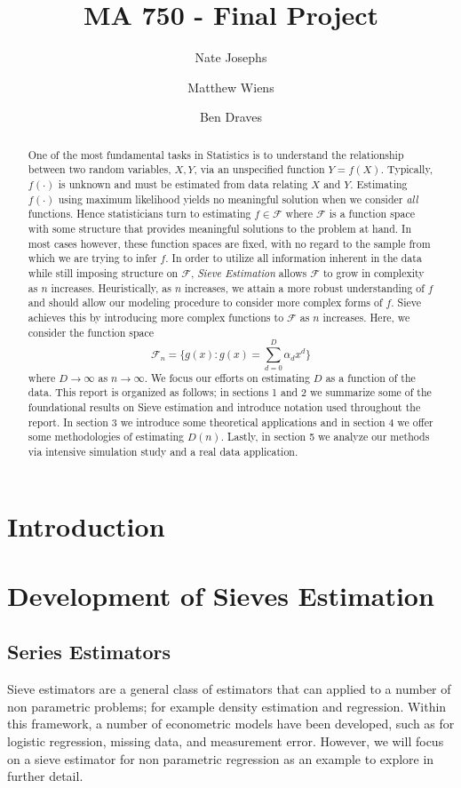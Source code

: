 \documentclass[12pt]{article}  %
\title{MA 750 - Final Project}
\author{
  Nate Josephs\\
  \and
  Matthew Wiens 
  \and 
  Ben Draves
}
\begin{document}
\maketitle 
\begin{abstract} One of the most fundamental tasks in Statistics is to understand the relationship between two random variables, $X,Y$, via an unspecified function $Y = f(X)$. Typically, $f(\cdot)$ is unknown and must be estimated from data relating $X$ and $Y$. Estimating $f(\cdot)$ using maximum likelihood yields no meaningful solution when we consider \textit{all} functions. Hence statisticians turn to estimating $f\in\mathcal{F}$ where $\mathcal{F}$ is a function space with some structure that provides meaningful solutions to the problem at hand. In most cases however, these function spaces are fixed, with no regard to the sample from which we are trying to infer $f$. In order to utilize all information inherent in the data while still imposing structure on $\mathcal{F}$, \textit{Sieve Estimation} allows $\mathcal{F}$ to grow in complexity as $n$ increases. Heuristically, as $n$ increases, we attain a more robust understanding of $f$ and should allow our modeling procedure to consider more complex forms of $f$. Sieve achieves this by introducing more complex functions to $\mathcal{F}$ as $n$ increases. Here, we consider the function space $$\mathcal{F}_n = \Big\{g(x): g(x) = \sum_{d=0}^{D}\alpha_dx^d\Big\}$$ where $D\to\infty$ as $n\to\infty$. We focus our efforts on estimating $D$ as a function of the data. This report is organized as follows; in sections 1 and 2 we summarize some of the foundational results on Sieve estimation and introduce notation used throughout the report. In section 3 we introduce some theoretical applications and in section 4 we offer some methodologies of estimating $D(n)$. Lastly, in section 5 we analyze our methods via intensive simulation study and a real data application.


\end{abstract}
  
\section{Introduction}
\section{Development of Sieves Estimation}

\subsection{Series Estimators}
Sieve estimators are a general class of estimators that can applied to a number of non parametric problems; for example density estimation and regression. Within this framework, a number of econometric models have been developed, such as for logistic regression, missing data, and measurement error. However, we will focus on a sieve estimator for non parametric regression as an example to explore in further detail. 
\end{document}
